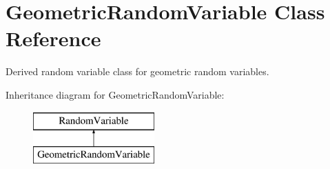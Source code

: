 \section{Geometric\+Random\+Variable Class Reference}
\label{classPecos_1_1GeometricRandomVariable}


Derived random variable class for geometric random variables.  


Inheritance diagram for Geometric\+Random\+Variable\+:\begin{figure}[H]
\begin{center}
\leavevmode
\includegraphics[height=2.000000cm]{classPecos_1_1GeometricRandomVariable}
\end{center}
\end{figure}
